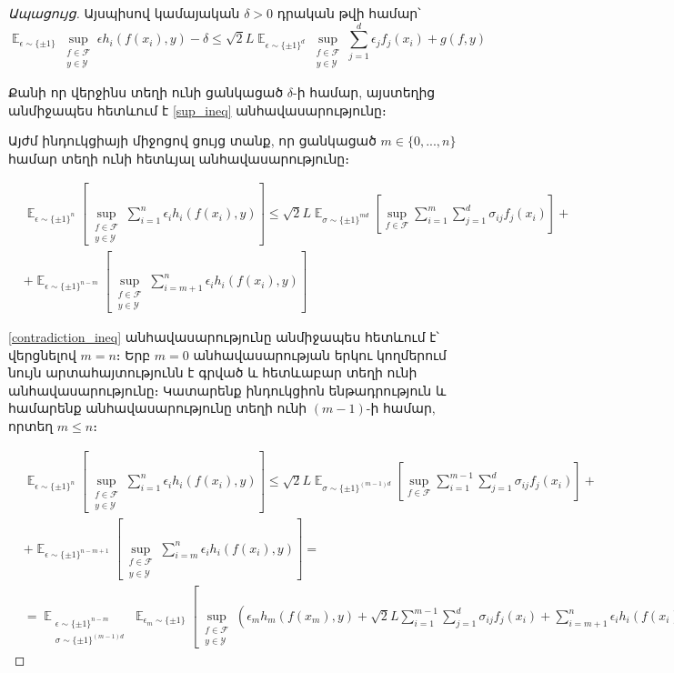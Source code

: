 \documentclass[12pt]{article}
\DeclareMathOperator*{\E}{\mathbb{E}}
\begin{document}
\begin{proof}[Ապացույց]
Այսպիսով կամայական $\delta > 0$ դրական թվի համար՝
$$\E_{\epsilon \sim \{\pm1\}}\sup_{\substack{f \in \mathcal{F} \\ y \in \mathcal{Y}}}    {\epsilon h_i(f(x_i), y)} - \delta  \leq {\sqrt{2}L} \E_{\epsilon \sim \{\pm 1\}^d}        \sup_{\substack{f \in \mathcal{F}  \\ y \in \mathcal{Y}  }}     \sum_{j=1}^d \epsilon_j f_j(x_i)    +   g(f, y)   $$

Քանի որ վերջինս տեղի ունի ցանկացած  $\delta$-ի համար, այստեղից անմիջապես հետևում է \ref{sup_ineq} անհավասարությունը։

\par Այժմ ինդուկցիայի միջոցով ցույց տանք,
որ  ցանկացած $m \in \{0, ..., n\}$ համար տեղի ունի հետևյալ անհավասարությունը։

\begin{align*}
&\E_{\epsilon \sim \{\pm 1\}^n}\left[\sup_{\substack{f \in \mathcal{F} \\ y \in \mathcal{Y}} }  \sum_{i=1}^n{\epsilon_ih_i(f(x_i), y)}  \right]    \leq \sqrt{2}L \E_{\sigma \sim \{\pm1\}^{md}} \left[  \sup_{f \in \mathcal{F}}  \sum_{i=1}^m\sum_{j=1}^d{\sigma_{ij}f_j(x_i)}   \right] +\\ &+\E_{\epsilon \sim \{\pm 1\}^{n-m}}\left[\sup_{\substack{f \in \mathcal{F} \\ y \in \mathcal{Y}} }  \sum_{i=m+1}^n{\epsilon_ih_i(f(x_i), y)}  \right]   
\end{align*}

\ref{contradiction_ineq} անհավասարությունը անմիջապես հետևում է՝ վերցնելով $m = n$։ Երբ $m=0$ անհավասարության երկու կողմերում նույն արտահայտությունն է գրված և հետևաբար տեղի ունի անհավասարությունը։ Կատարենք ինդուկցիոն ենթադրություն և համարենք անհավասարությունը տեղի ունի $(m-1)$-ի համար, որտեղ $m \leq n$։



\begin{align*}
&\E_{\epsilon \sim \{\pm 1\}^n}\left[\sup_{\substack{f \in \mathcal{F} \\ y \in \mathcal{Y}} }  \sum_{i=1}^n{\epsilon_ih_i(f(x_i), y)}  \right]   
 \leq \sqrt{2}L \E_{\sigma \sim \{\pm1\}^{(m-1)d}} \left[  \sup_{f \in \mathcal{F}}  \sum_{i=1}^{m-1}\sum_{j=1}^d{\sigma_{ij}f_j(x_i)}   \right] +\\ 
 &+\E_{\epsilon \sim \{\pm 1\}^{n-m+1}}\left[\sup_{\substack{f \in \mathcal{F} \\ y \in \mathcal{Y}} }  \sum_{i=m}^n{\epsilon_ih_i(f(x_i), y)}  \right] = \\  
 &= \E_{\substack{\epsilon \sim \{ \pm 1\}^{n-m}   \\ \sigma \sim \{ \pm 1\}^{(m-1)d} }}     \E_{\epsilon_m \sim \{ \pm1 \}} \left [          \sup_{\substack{f \in \mathcal{F} \\ y \in \mathcal{Y}}}     \left(\epsilon_m h_m(f(x_m), y)   +   \sqrt{2}L 				 \sum_{i=1}^{m-1}\sum_{j=1}^d{\sigma_{ij}f_j(x_i)}  + \sum_{i = m+1}^n \epsilon_ih_i(f(x_i), y)				\right )	\right ]
\end{align*}



\end{proof}
\end{document}
